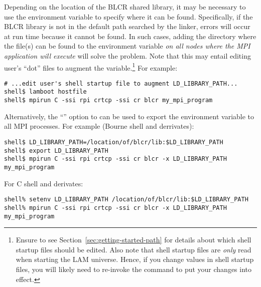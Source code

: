 
Depending on the location of the BLCR shared library, it may be
necessary to use the  environment
variable to specify where it can be found.  Specifically, if the BLCR
library is not in the default path searched by the linker, errors will
occur at run time because it cannot be found.  In such cases, adding
the directory where the  file(s) can be found to the
 environment variable {\em on all nodes
  where the MPI application will execute} will solve the problem.
%
Note that this may entail editing user's ``dot'' files to augment the
 variable.\footnote{Ensure to see
  Section~\ref{sec:getting-started-path} for details about which
  shell startup files should be edited.  Also note that 
  shell startup files are {\em only} read when starting the LAM
  universe.  Hence, if you change values in shell startup files, you
  will likely need to re-invoke the  command to put your
  changes into effect.}  For example:

\lstset{style=lam-cmdline}
\begin{lstlisting}
# ...edit user's shell startup file to augment LD_LIBRARY_PATH...
shell$ lamboot hostfile
shell$ mpirun C -ssi rpi crtcp -ssi cr blcr my_mpi_program
\end{lstlisting}

Alternatively, the ``'' option to  can be used to
export the  environment variable to all
MPI processes.  For example (Bourne shell and derrivates):

\lstset{style=lam-cmdline}
\begin{lstlisting}
shell$ LD_LIBRARY_PATH=/location/of/blcr/lib:$LD_LIBRARY_PATH
shell$ export LD_LIBRARY_PATH
shell$ mpirun C -ssi rpi crtcp -ssi cr blcr -x LD_LIBRARY_PATH my_mpi_program
\end{lstlisting}

For C shell and derivates:

\lstset{style=lam-cmdline}
\begin{lstlisting}
shell% setenv LD_LIBRARY_PATH /location/of/blcr/lib:$LD_LIBRARY_PATH
shell% mpirun C -ssi rpi crtcp -ssi cr blcr -x LD_LIBRARY_PATH my_mpi_program
\end{lstlisting}


 
